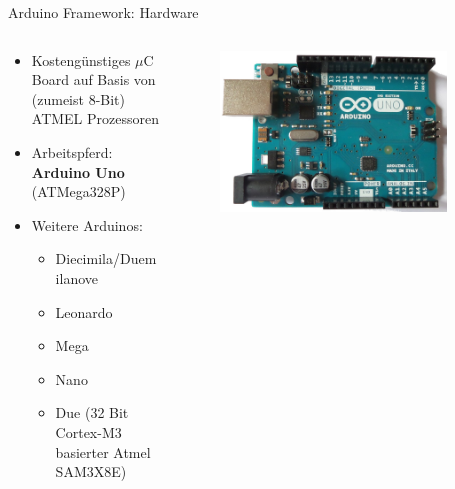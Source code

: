 \documentclass{beamer}
\begin{document}
\begin{frame}{Arduino Framework: Hardware}
\begin{columns}
 \begin{column}{0.6\textwidth}
 \begin{itemize}
  \item Kosteng\"unstiges $\mu$C Board auf Basis von (zumeist 8-Bit) ATMEL Prozessoren
 \end{itemize}
 \begin{itemize}
  \item Arbeitspferd: \textbf{Arduino Uno} (ATMega328P)
 \end{itemize}
 \begin{itemize}
  \item Weitere Arduinos:
  \begin{itemize}
   \item Diecimila/Duemilanove
   \item Leonardo
   \item Mega
   \item Nano
   \item Due (32 Bit Cortex-M3 basierter Atmel SAM3X8E)
  \end{itemize}
 \end{itemize}
 \end{column}
 \begin{column}{0.4\textwidth}
  \begin{figure}[H]
   \centering
   \includegraphics[width=0.9\textwidth]{./images/arduino-uno.jpg}
   \label{fig:arduino-uno}
  \end{figure}
 \end{column}
\end{columns}
\end{frame}
\end{document}
